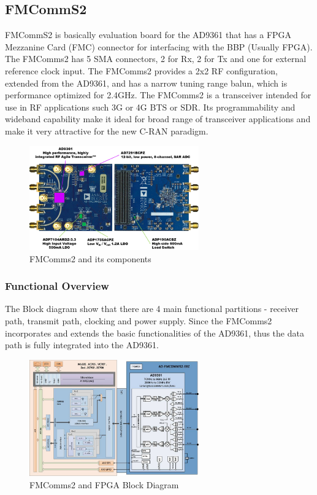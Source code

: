 \subsection{FMCommS2}

FMCommS2 is basically evaluation board for the AD9361 that has a FPGA Mezzanine Card (FMC) connector for interfacing with the BBP (Usually FPGA). The FMComms2 has 5 SMA connectors, 2 for Rx, 2 for Tx and one for external reference clock input. The FMComms2 provides a 2x2 RF configuration, extended from the AD9361, and has  a narrow tuning range balun, which is performance optimized for 2.4GHz.
The FMComms2 is a transceiver intended for use in RF applications such 3G or 4G BTS or SDR. Its programmability and wideband capability make it ideal for broad range of transceiver applications and make it very attractive for the new C-RAN paradigm.

\begin{figure}[htbp]
    \centering
    \includegraphics[width=0.65\textwidth]{./figures/fmcomms2_pic}
    \caption{ FMComms2 and its components
    \label{fig:fmcomm}}
\end{figure}


\subsubsection{Functional Overview}

The Block diagram show that there are 4 main functional partitions - receiver path, transmit path, clocking and power supply. Since the FMComms2 incorporates and extends the basic functionalities of the AD9361, thus the data path is fully integrated into the AD9361.

\begin{figure}[htbp]
    \centering
    \includegraphics[width=0.65\textwidth]{./figures/fmcomms2_bd}
    \caption{ FMComms2 and FPGA Block Diagram
    \label{fig:fmcommbd}}
\end{figure}



